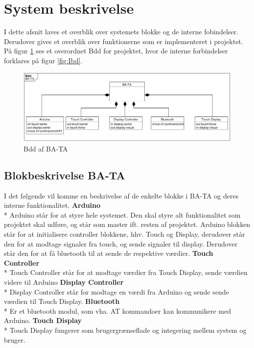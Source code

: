 \graphicspath{{Chapters/System/}}


\section{System beskrivelse}
I dette afsnit laves et overblik over systemets blokke og de interne fobindelser. Derudover gives et overblik over funktionerne som er implementeret i projektet. 
På figur \ref{fig:Bdd} ses et overordnet Bdd for projektet, hvor de interne forbindelser forklares på figur \ref{fig:Ibd}. 

\begin{figure}[H]
	\centering
	\includegraphics[width = 500 pt]{Img/Bdd.png}
	\caption{Bdd af BA-TA}
	\label{fig:Bdd}
\end{figure}

\subsection{Blokbeskrivelse BA-TA}
I det følgende vil komme en beskrivelse af de enkelte blokke i BA-TA og deres interne funktionalitet.
\newline
\newline
\textbf{Arduino} \\*
Arduino står for at styre hele systemet. Den skal styre alt funktionalitet som projektet skal udføre, og står som master ift. resten af projektet. Arduino blokken står for at initialisere  controller blokkene, hhv. Touch og Display, derudover står den for at modtage signaler fra touch, og sende signaler til display. Derudover står den for at få bluetooth til at sende de respektive værdier.
\newline
\newline
\textbf{Touch Controller} \\*
Touch Controller står for at modtage værdier fra Touch Display, sende værdien videre til Arduino 
\newline
\newline
\textbf{Display Controller} \\*
Display Controller står for modtage en værdi fra Arduino og sende sende værdien til Touch Display. \newline
\newline
\textbf{Bluetooth} \\*
Er et bluetooth modul, som vha. AT kommandoer kan kommunikere med Arduino.
\newline
\newline
\textbf{Touch Display} \\*
Touch Display fungerer som brugergrænseflade og integering mellem system og bruger. 
